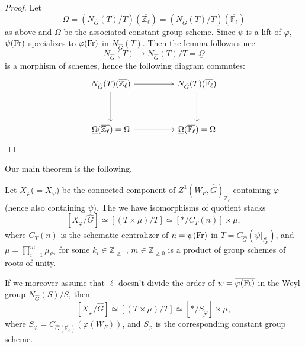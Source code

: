 \begin{proof}
	Let 
	$$\Omega=\left(N_{\hat{G}}(T)/T\right)(\overline{\mathbb{Z}_{\ell}}) = \left(N_{\hat{G}}(T)/T\right)(\overline{\mathbb{F}_{\ell}})$$ 
	as above and $\underline{\Omega}$ be the associated constant group scheme. Since $\psi$ is a lift of $\varphi$, $\psi(\operatorname{Fr})$ specializes to $\varphi(\operatorname{Fr})$ in $N_{\hat{G}}(T)$. Then the lemma follows since 
	$$N_{\hat{G}}(T) \to N_{\hat{G}}(T)/T=\underline{\Omega}$$
	is a morphism of schemes, hence the following diagram commutes:
	$$
	\begin{tikzcd}
		{N_{\hat{G}}(T)(\overline{\mathbb{Z}_\ell})} && {N_{\hat{G}}(T)(\overline{\mathbb{F}_\ell})} \\
		\\
		{\underline{\Omega}(\overline{\mathbb{Z}_\ell})=\Omega} && {\underline{\Omega}(\overline{\mathbb{F}_\ell})=\Omega}
		\arrow[from=1-1, to=1-3]
		\arrow[from=1-1, to=3-1]
		\arrow[from=3-1, to=3-3]
		\arrow[from=1-3, to=3-3]
	\end{tikzcd}
$$
\end{proof}

Our main theorem is the following.

\begin{theorem}\label{Thm X/G}
	Let $X_{\varphi}$($=X_{\psi}$) be the connected component of $Z^1(W_F, \hat{G})_{\overline{\mathbb{Z}_{\ell}}}$ containing $\varphi$ (hence also containing $\psi$). The we have isomorphisms of quotient stacks
	$$[X_{\varphi}/\hat{G}] \simeq [(T \times \mu)/T] \simeq [*/{C_T(n)}] \times \mu,$$
	where $C_T(n)$ is the schematic centralizer of $n=\psi(\operatorname{Fr})$ in $T=C_{\hat{G}}(\psi|_{I_F^{\ell}})$, and $\mu=\prod_{i=1}^m\mu_{\ell^{k_i}}$ for some $k_i \in \mathbb{Z}_{\geq 1}$, $m \in \mathbb{Z}_{\geq 0}$ is a product of group schemes of roots of unity. 
	
	If we moreover assume that
    $\ell$ doesn't divide the order of $w=\overline{\varphi(\operatorname{Fr})}$ in the Weyl group $N_{\hat{G}}(S)/S$,
	then 
	$$[X_{\varphi}/\hat{G}] \simeq [(T \times \mu)/T] \simeq [*/\underline{S_{\varphi}}] \times \mu,$$
	where $S_{\varphi}=C_{\hat{G}(\overline{\mathbb{F}_{\ell}})}(\varphi(W_F))$, and $\underline{S_{\varphi}}$ is the corresponding constant group scheme.
\end{theorem}

